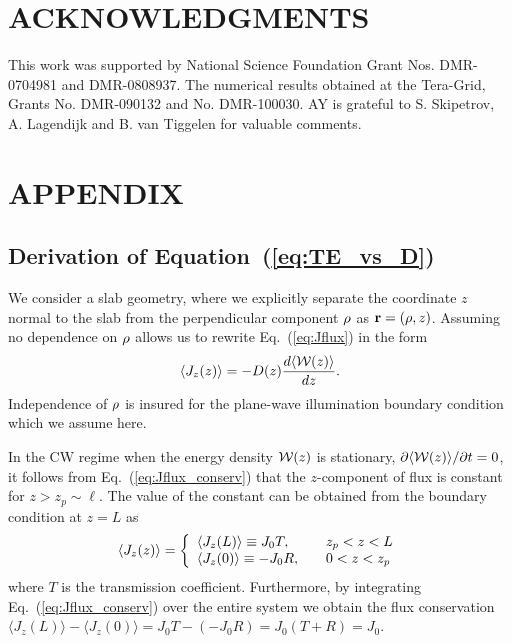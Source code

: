 \section{ACKNOWLEDGMENTS}
 
This work was supported by National Science Foundation Grant Nos. DMR-0704981 and DMR-0808937. The numerical
results obtained at the Tera-Grid, Grants No. DMR-090132 and No. DMR-100030. AY is grateful to S. Skipetrov, A. Lagendijk and B. van Tiggelen for valuable comments.

\section{APPENDIX}

\subsection{Derivation of Equation~(\ref{eq:TE_vs_D})}
\label{app:Dz_derivation}
We consider a slab geometry, where we explicitly  separate the coordinate $z$ normal to the slab from the perpendicular component ${\bf \rho}$ as ${\bf r}=({\bf \rho},z)$. Assuming no dependence on ${\bf \rho}$ allows us to rewrite Eq.~(\ref{eq:Jflux}) in the form
\begin{equation}
\langle J_z(z)\rangle=
\displaystyle -D(z)\frac{d\langle {\cal W}(z)\rangle}{dz}.
\label{eq:Jfluxz}
\end{equation}
Independence of ${\bf \rho}$ is insured for the plane-wave illumination boundary condition which we assume here. 

In the CW regime when the energy density ${\cal W}(z)$ is stationary, $\partial \langle {\cal W}(z)\rangle/\partial t=0$, it follows from Eq.~(\ref{eq:Jflux_conserv}) that the $z$-component of flux is constant for $z>z_p\sim\ell$. The value of the constant can be obtained from the boundary condition at $z=L$ as
\begin{equation}
\langle J_z(z)\rangle=\left\{
\begin{array}{l l}
\langle J_z(L)\rangle\equiv J_0 T,&\quad z_p<z<L\\
\langle J_z(0)\rangle\equiv -J_0 R,&\quad 0<z<z_p\\
\end{array} \right.
\label{eq:Jfluxz_const}
\end{equation}
where $T$ is the transmission coefficient. Furthermore, by integrating Eq.~(\ref{eq:Jflux_conserv}) over the entire system we obtain the flux conservation $\langle J_z(L)\rangle -\langle J_z(0)\rangle =J_0 T-(-J_0 R)=J_0(T+R)=J_0$.

